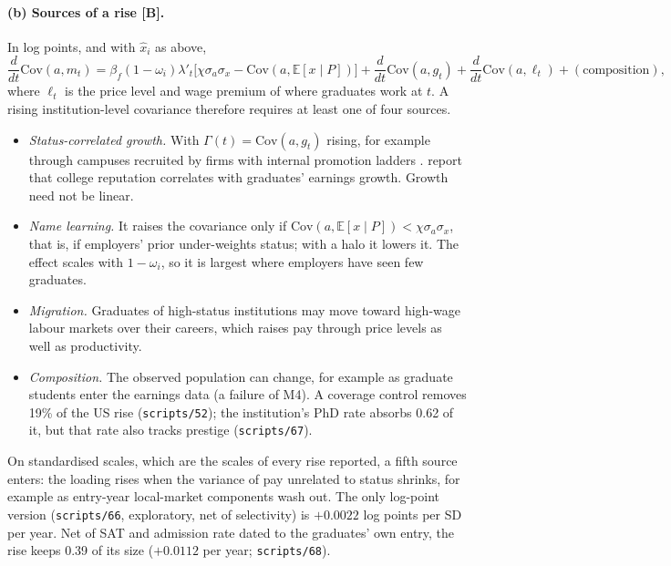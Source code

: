 \paragraph{(b) Sources of a rise [B].} In log points, and with $\hat x_i$ as above,
\[
\frac{d}{dt}\mathrm{Cov}(a,m_t)=\beta_f(1-\omega_i)\lambda'_t\big[\chi\sigma_a\sigma_x-\mathrm{Cov}(a,\mathbb E[x\mid P])\big]
+\frac{d}{dt}\mathrm{Cov}(a,g_t)+\frac{d}{dt}\mathrm{Cov}(a,\ell_t)+(\text{composition}),
\]
where $\ell_t$ is the price level and wage premium of where graduates work at $t$. A rising institution-level
covariance therefore requires at least one of four sources.
\begin{itemize}
\item \emph{Status-correlated growth.} With $\Gamma(t)=\mathrm{Cov}(a,g_t)$ rising, for example through campuses
recruited by firms with internal promotion ladders \citep{gibbons1999theory,rivera2015pedigree,weinstein2018employer}.
\citet{macleod2017big} report that college reputation correlates with graduates' earnings growth. Growth need not
be linear.
\item \emph{Name learning.} It raises the covariance only if $\mathrm{Cov}(a,\mathbb E[x\mid P])<\chi\sigma_a\sigma_x$,
that is, if employers' prior under-weights status; with a halo it lowers it. The effect scales with
$1-\omega_i$, so it is largest where employers have seen few graduates.
\item \emph{Migration.} Graduates of high-status institutions may move toward high-wage labour markets over their
careers, which raises pay through price levels as well as productivity.
\item \emph{Composition.} The observed population can change, for example as graduate students enter the
earnings data (a failure of M4). A coverage control removes 19\% of the US rise (\texttt{scripts/52}); the
institution's PhD rate absorbs 0.62  of it, but that rate also tracks prestige (\texttt{scripts/67}).
\end{itemize}
On standardised scales, which are the scales of every rise reported, a fifth source enters: the loading rises when
the variance of pay unrelated to status shrinks, for example as entry-year local-market components wash out. The
only log-point version (\texttt{scripts/66}, exploratory, net of selectivity) is $+0.0022$ 
log points per SD per year. Net of SAT and admission rate dated to the graduates' own entry, the rise keeps 0.39 of
its size ($+0.0112$  per year; \texttt{scripts/68}).


